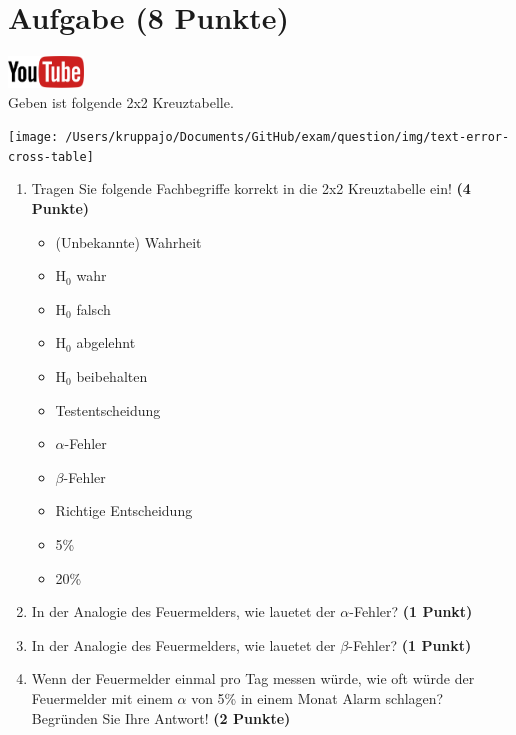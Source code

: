 \documentclass[a4paper, 10pt]{scrartcl}\usepackage[]{graphicx}\usepackage[]{xcolor}
\begin{document}
\section{Aufgabe \hfill (8 Punkte)}

\hfill\href{https://youtu.be/3DfWs9NNrCk}{\includegraphics[width =
  2cm]{img/youtube}}\\[1Ex]




Geben ist folgende 2x2 Kreuztabelle. 

\begin{center}
  \texttt{[image: /Users/kruppajo/Documents/GitHub/exam/question/img/text-error-cross-table]}
\end{center}

\begin{enumerate}
\item Tragen Sie folgende Fachbegriffe korrekt in die 2x2 Kreuztabelle ein! \textbf{(4 Punkte)}
  \begin{itemize}
  \item (Unbekannte) Wahrheit	
  \item H$_0$ wahr
  \item H$_0$ falsch
  \item H$_0$ abgelehnt
  \item H$_0$ beibehalten
  \item Testentscheidung
  \item $\alpha$-Fehler
  \item $\beta$-Fehler
  \item Richtige Entscheidung
  \item 5\%
  \item 20\%
  \end{itemize}
\item In der Analogie des Feuermelders, wie lauetet der $\alpha$-Fehler? \textbf{(1 Punkt)}
\item In der Analogie des Feuermelders, wie lauetet der $\beta$-Fehler? \textbf{(1 Punkt)}
\item Wenn der Feuermelder einmal pro Tag messen w{\"u}rde, wie oft w{\"u}rde der
  Feuermelder mit einem $\alpha$ von 5\% in einem Monat Alarm schlagen?
  Begr{\"u}nden Sie Ihre Antwort! \textbf{(2 Punkte)}
\end{enumerate}
\end{document}

